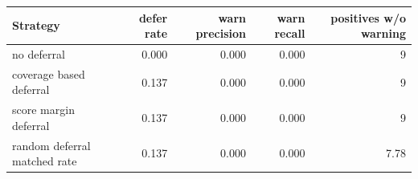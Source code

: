 \begin{tabular}{lrrrr}
\toprule
Strategy & defer rate & warn precision & warn recall & positives w/o warning \\
\midrule
no deferral & 0.000 & 0.000 & 0.000 & 9 \\
coverage based deferral & 0.137 & 0.000 & 0.000 & 9 \\
score margin deferral & 0.137 & 0.000 & 0.000 & 9 \\
random deferral matched rate & 0.137 & 0.000 & 0.000 & 7.78 \\
\bottomrule
\end{tabular}
